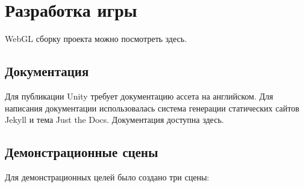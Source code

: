 ﻿%
\section{Разработка игры}

WebGL сборку проекта можно посмотреть здесь\cite{s9}.

\subsection{Документация}
Для публикации Unity требует документацию ассета на английском. Для написания документации использовалась система генерации статических сайтов Jekyll\cite{s11} и тема Just the Docs\cite{s12}. Документация доступна здесь\cite{s13}.


\subsection{Демонстрационные сцены}
Для демонстрационных целей было создано три сцены:

